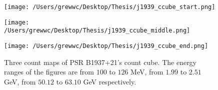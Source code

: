 \documentclass[12pt]{report}
\newcommand{\add}[1]{
  $<$\colorbox{red}{\textbf{add}}$>$#1$<$\colorbox{red}{\textbf{/add}}$>$
}
\begin{document}
          \begin{figure}[!ht]
            \begin{minipage}{0.32\textwidth}
              \begin{center} 
                \texttt{[image: /Users/grewwc/Desktop/Thesis/j1939\_ccube\_start.png]}
              \end{center}
            \end{minipage}
            \begin{minipage}{0.32\textwidth}
              \begin{center}
                \texttt{[image: /Users/grewwc/Desktop/Thesis/j1939\_ccube\_middle.png]}
              \end{center}
            \end{minipage}
            \begin{minipage}{0.32\textwidth}
              \begin{center}
              \texttt{[image: /Users/grewwc/Desktop/Thesis/j1939\_ccube\_end.png]}
              \end{center}
            \end{minipage}
            \caption{Three count maps of PSR B1937+21's count cube. The energy ranges of the 
              figures are from $100$ to $126$ MeV, from $1.99$ to $2.51$ GeV, from $50.12$ to
              $63.10$ GeV respectively.}
            \label{fig: j1939_count_cube}
          \end{figure}
\end{document}

